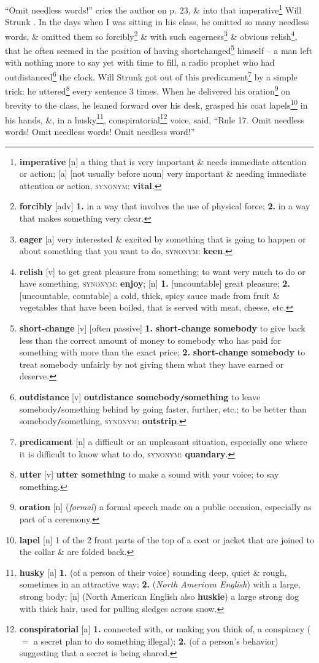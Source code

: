 \documentclass[oneside]{book}
\numberwithin{equation}{section}
\begin{document}
``Omit needless words!'' cries the author on p. 23, \& into that imperative\footnote{\textbf{imperative} [n] a thing that is very important \& needs immediate attention or action; [a] [not usually before noun] very important \& needing immediate attention or action, \textsc{synonym}: \textbf{vital}.} Will Strunk . In the days when I was sitting in his class, he omitted so many needless words, \& omitted them so forcibly\footnote{\textbf{forcibly} [adv] \textbf{1.} in a way that involves the use of physical force; \textbf{2.} in a way that makes something very clear.} \& with such eagerness\footnote{\textbf{eager} [a] very interested \& excited by something that is going to happen or about something that you want to do, \textsc{synonym}: \textbf{keen}.} \& obvious relish\footnote{\textbf{relish} [v] to get great pleasure from something; to want very much to do or have something, \textsc{synonym}: \textbf{enjoy}; [n] \textbf{1.} [uncountable] great pleasure; \textbf{2.} [uncountable, countable] a cold, thick, spicy sauce made from fruit \& vegetables that have been boiled, that is served with meat, cheese, etc.}, that he often seemed in the position of having shortchanged\footnote{\textbf{short-change} [v] [often passive] \textbf{1.} \textbf{short-change somebody} to give back less than the correct amount of money to somebody who has paid for something with more than the exact price; \textbf{2.} \textbf{short-change somebody} to treat somebody unfairly by not giving them what they have earned or deserve.} himself -- a man left with nothing more to say yet with time to fill, a radio prophet who had outdistanced\footnote{\textbf{outdistance} [v] \textbf{outdistance somebody\texttt{/}something} to leave somebody\texttt{/}something behind by going faster, further, etc.; to be better than somebody\texttt{/}something, \textsc{synonym}: \textbf{outstrip}.} the clock. Will Strunk got out of this predicament\footnote{\textbf{predicament} [n] a difficult or an unpleasant situation, especially one where it is difficult to know what to do, \textsc{synonym}: \textbf{quandary}.} by a simple trick: he uttered\footnote{\textbf{utter} [v] \textbf{utter something} to make a sound with your voice; to say something.} every sentence 3 times. When he delivered his oration\footnote{\textbf{oration} [n] (\textit{formal}) a formal speech made on a public occasion, especially as part of a ceremony.} on brevity to the class, he leaned forward over his desk, grasped his coat lapels\footnote{\textbf{lapel} [n] 1 of the 2 front parts of the top of a coat or jacket that are joined to the collar \& are folded back.} in his hands, \&, in a husky\footnote{\textbf{husky} [a] \textbf{1.} (of a person of their voice) sounding deep, quiet \& rough, sometimes in an attractive way; \textbf{2.} (\textit{North American English}) with a large, strong body; [n] (North American English also \textbf{huskie}) a large strong dog with thick hair, used for pulling sledges across snow.}, conspiratorial\footnote{\textbf{conspiratorial} [a] \textbf{1.} connected with, or making you think of, a conspiracy ($=$ a secret plan to do something illegal); \textbf{2.} (of a person's behavior) suggesting that a secret is being shared.} voice, said, ``Rule 17. Omit needless words! Omit needless words! Omit needless word!''
\end{document}

